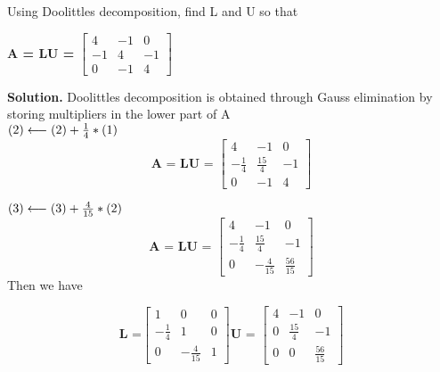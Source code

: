 \begin{exercise}{2} %
Using Doolittle\textquotesingle s decomposition, find L and U so that
\begin{center}
\textbf{A = LU = }
$\begin{bmatrix}
4&-1&0\\ 
-1&4&-1\\
0&-1&4
\end{bmatrix}
$ 
\end{center}

\textbf{Solution.}
Doolittle\textquotesingle s decomposition is obtained through Gauss elimination by storing multipliers in the lower part of A \\
$
(2) \longleftarrow (2) + \frac{1}{4} *(1)\\
$
$$\textbf{A = LU = }
\begin{bmatrix}
4&-1&0\\ 
\boxed{-\frac{1}{4}}&\frac{15}{4}&-1\\
0&-1&4
\end{bmatrix}
$$ 

$
(3) \longleftarrow (3) + \frac{4}{15}*(2)\\
$
$$\textbf{A = LU = }
\begin{bmatrix}
4&-1&0\\ 
\boxed{-\frac{1}{4}}&\frac{15}{4}&-1\\
0&\boxed{-\frac{4}{15}} & \frac{56}{15}
\end{bmatrix}
$$ 
Then we have

$$\textbf{L =}
\begin{bmatrix}
1&0&0\\ 
-\frac{1}{4}&1&0\\
0&-\frac{4}{15} & 1
\end{bmatrix}
\textbf{U = }
\begin{bmatrix}
4&-1&0\\ 
0&\frac{15}{4}&-1\\
0&0 & \frac{56}{15}
\end{bmatrix}
$$ 

\end{exercise}



